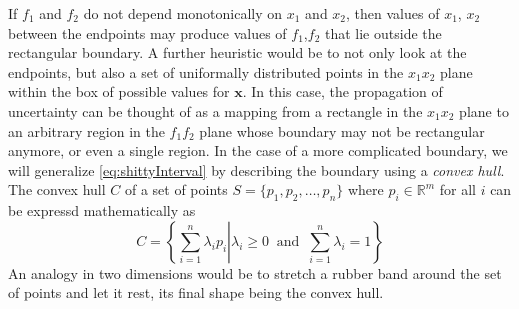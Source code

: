 If $f_1$ and $f_2$ do not depend monotonically on $x_1$ and $x_2$, then values of $x_1$, $x_2$ between the endpoints may produce values of $f_1$,$f_2$ that lie outside the rectangular boundary. A further heuristic would be to not only look at the endpoints, but also a set of uniformally distributed points in the $x_1x_2$ plane within the box of possible values for $\mathbf{x}$. In this case, the propagation of uncertainty can be thought of as a mapping from a rectangle in the $x_1x_2$ plane to an arbitrary region in the $f_1f_2$ plane whose boundary may not be rectangular anymore, or even a single region. In the case of a more complicated boundary, we will generalize \eqref{eq:shittyInterval} by describing the boundary using a \emph{convex hull}. The convex hull $C$ of a set of points $S = \lbrace p_1, p_2, \dots, p_n \rbrace$ where $p_i \in \mathbb{R}^m$ for all $i$ can be expressd mathematically as
\begin{equation} \label{eq:convexhull}
C = \left\lbrace\left.
  \sum_{i=1}^n \lambda_i p_i \right|
  \lambda_i \ge 0
  \;\; \mathrm{and} \;\;
  \sum_{i=1}^n \lambda_i = 1
  \right\rbrace
\end{equation}
An analogy in two dimensions would be to stretch a rubber band around the set of points and let it rest, its final shape being the convex hull.


